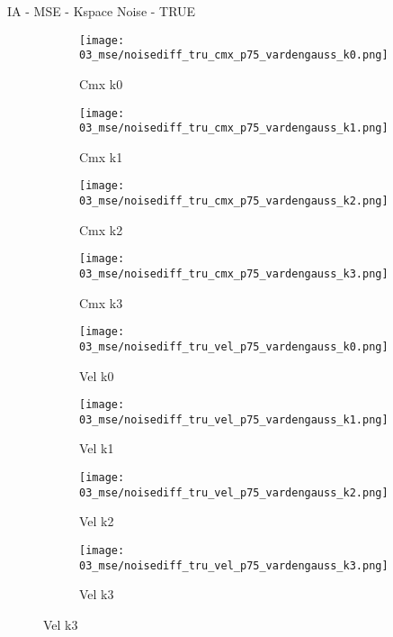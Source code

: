 \documentclass{beamer}
\begin{document}
\begin{frame}{IA - MSE - Kspace Noise - TRUE}{}
\begin{figure}
\begin{subfigure}{0.24\textwidth}
\texttt{[image: 03\_mse/noisediff\_tru\_cmx\_p75\_vardengauss\_k0.png]}
\vspace{-20pt}
\caption*{\tiny Cmx k0}
\end{subfigure}
\begin{subfigure}{0.24\textwidth}
\texttt{[image: 03\_mse/noisediff\_tru\_cmx\_p75\_vardengauss\_k1.png]}
\vspace{-20pt}
\caption*{\tiny Cmx k1}
\end{subfigure}
\begin{subfigure}{0.24\textwidth}
\texttt{[image: 03\_mse/noisediff\_tru\_cmx\_p75\_vardengauss\_k2.png]}
\vspace{-20pt}
\caption*{\tiny Cmx k2}
\end{subfigure}
\begin{subfigure}{0.24\textwidth}
\texttt{[image: 03\_mse/noisediff\_tru\_cmx\_p75\_vardengauss\_k3.png]}
\vspace{-20pt}
\caption*{\tiny Cmx k3}
\end{subfigure}

\begin{subfigure}{0.24\textwidth}
\texttt{[image: 03\_mse/noisediff\_tru\_vel\_p75\_vardengauss\_k0.png]}
\vspace{-20pt}
\caption*{\tiny Vel k0}
\end{subfigure}
\begin{subfigure}{0.24\textwidth}
\texttt{[image: 03\_mse/noisediff\_tru\_vel\_p75\_vardengauss\_k1.png]}
\vspace{-20pt}
\caption*{\tiny Vel k1}
\end{subfigure}
\begin{subfigure}{0.24\textwidth}
\texttt{[image: 03\_mse/noisediff\_tru\_vel\_p75\_vardengauss\_k2.png]}
\vspace{-20pt}
\caption*{\tiny Vel k2}
\end{subfigure}
\begin{subfigure}{0.24\textwidth}
\texttt{[image: 03\_mse/noisediff\_tru\_vel\_p75\_vardengauss\_k3.png]}
\vspace{-20pt}
\caption*{\tiny Vel k3}
\end{subfigure}
\end{figure}
\end{frame}
\end{document}

